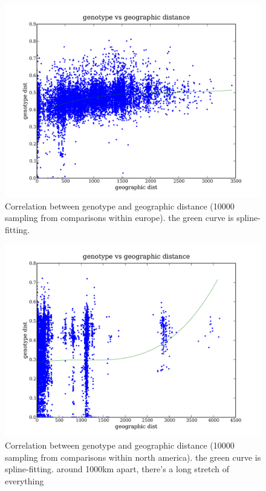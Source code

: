 \documentclass[a4paper,10pt]{article}
\begin{document}
\begin{figure}
\includegraphics[width=1\textwidth]{figures/data_d110_c0_5_geno_vs_geo_dist_eur.png}
\caption{Correlation between genotype and geographic distance (10000 sampling from comparisons within europe). the green curve is spline-fitting.}\label{fggd_3}
\end{figure}


\begin{figure}
\includegraphics[width=1\textwidth]{figures/data_d110_c0_5_geno_vs_geo_dist_noramer.png}
\caption{Correlation between genotype and geographic distance (10000 sampling from comparisons within north america). the green curve is spline-fitting. around 1000km apart, there's a long stretch of everything}\label{fggd_4}
\end{figure}
\end{document}
